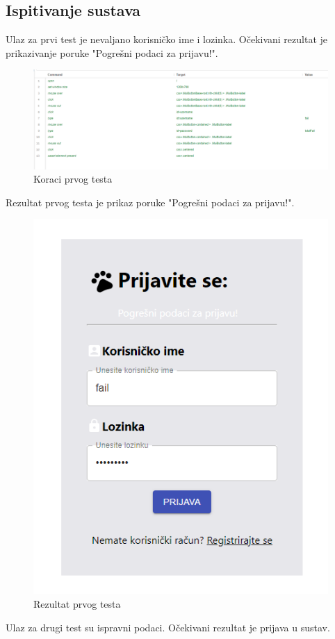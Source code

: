 	\eject

	\subsection{Ispitivanje sustava}
	
	\noindent Ulaz za prvi test je nevaljano korisničko ime i lozinka. Očekivani rezultat je prikazivanje poruke "Pogrešni podaci za prijavu!".
	
	\begin{figure}[H]
		\includegraphics[width=\linewidth]{slike/front-testovi-1.png}
		\centering
		\caption{Koraci prvog testa}
		\label{fig:fronttestovi1}
	\end{figure}
	
	\noindent \newline Rezultat prvog testa je prikaz poruke "Pogrešni podaci za prijavu!".

	\begin{figure}[H]
		\includegraphics [width=0.50\linewidth]{slike/front-testovi-2.png}
		\centering
		\caption{Rezultat prvog testa}
		\label{fig:fronttestovi2}
	\end{figure}

	\eject

	\noindent Ulaz za drugi test su ispravni podaci. Očekivani rezultat je prijava u sustav.


